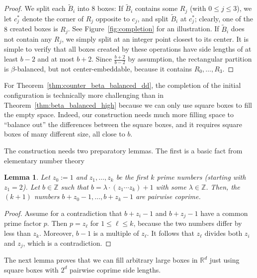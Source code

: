 \documentclass[12pt]{article}
\newcommand{\R}{\mathbb{R}}
\newcommand{\Z}{\mathbb{Z}}
\newtheorem{lemma}[theorem]{Lemma}
\begin{document}
\begin{appendix}
\begin{proof}
We split each $\tilde{B}_i$
into $8$ boxes: If $\tilde{B}_i$ contains some $R_j$ (with $0\leq j\leq 3$), 
we let $c^\ast_{j}$ denote the corner of $R_j$ opposite to $c_j$, and split $\tilde{B}_i$ at $c^\ast_j$;
clearly, one of the $8$ created boxes is $R_j$. See Figure~\ref{fig:completion} for an illustration.
If $\tilde{B}_i$ does not contain any $R_j$, we simply split at an integer point closest to its center.
It is simple to verify that all boxes created by these operations have side lengths of at least $b-2$
and at most $b+2$. Since $\frac{b+2}{b-2}$ by assumption, the rectangular partition is $\beta$-balanced,
but not center-embeddable, because it contains $R_0,\ldots,R_3$.
\end{proof}

For Theorem~\ref{thm:counter_beta_balanced_dd}, the completion of the initial configuration 
is technically more challenging than 
in Theorem~\ref{thm:beta_balanced_high} because we can only use 
square boxes to fill the empty space. Indeed, our construction needs much
more filling space to ``balance out'' the differences between the
square boxes, and it requires square boxes of many different size, all close to $b$.

The construction needs two preparatory lemmas. The first is a basic fact from elementary number theory

\begin{lemma}\label{lem:coprime_lemma}
Let $z_0:=1$ and $z_1,\ldots,z_k$ be the first $k$ prime numbers (starting with $z_1=2$).
Let $b\in\Z$ such that $b=\lambda\cdot (z_1\cdots z_k)+1$ with some $\lambda\in\Z$.
Then, the $(k+1)$ numbers
$b+z_0-1,\ldots,b+z_k-1$
are pairwise coprime.
\end{lemma}
\begin{proof}
Assume for a contradiction that $b+z_i-1$ and $b+z_j-1$ have a common prime factor $p$.
Then $p=z_\ell$ for $1\leq\ell\leq k$, because the two numbers differ by less than $z_k$.
Moreover, $b-1$ is a multiple of $z_\ell$. It follows that $z_\ell$ divides both $z_i$
and $z_j$, which is a contradiction.
\end{proof}

The next lemma proves that we can fill arbitrary
large boxes in $\R^d$ just using square boxes with $2^d$ pairwise coprime side lengths.


\end{appendix}
\end{document}
